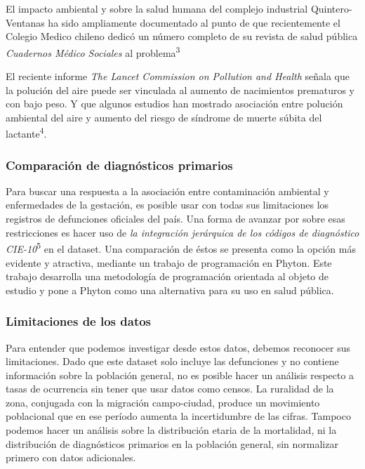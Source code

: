 \documentclass[]{article}
\begin{document}
El impacto ambiental y sobre la salud humana del complejo industrial
Quintero-Ventanas ha sido ampliamente documentado al punto de que recientemente el Colegio Medico chileno dedicó un número completo de su revista de salud
pública \emph{Cuadernos Médico Sociales} al problema\textsuperscript{{3}}

El reciente informe \emph{The Lancet Commission on Pollution and Health}
señala que la polución del aire puede ser vinculada al aumento de
nacimientos prematuros y con bajo peso. Y que algunos estudios han
mostrado asociación entre polución ambiental del aire y aumento del
riesgo de síndrome de muerte súbita del lactante\textsuperscript{{4}}.

\hypertarget{comparaciuxf3n-de-diagnuxf3sticos-primarios}{%
\subsubsection{Comparación de diagnósticos
primarios}\label{comparaciuxf3n-de-diagnuxf3sticos-primarios}}

Para buscar una respuesta a la asociación entre contaminación ambiental y enfermedades de la gestación, es posible usar con todas sus limitaciones los registros de defunciones oficiales del país. Una forma de avanzar por sobre esas restricciones es hacer uso de \emph{la integración jerárquica de los códigos de diagnóstico CIE-10}\textsuperscript{{5}}  en el dataset. Una comparación de éstos se presenta como la
opción más evidente y atractiva, mediante un trabajo de programación en Phyton. Este trabajo desarrolla una metodología de programación orientada al objeto de estudio y pone a Phyton como una alternativa para su uso en salud pública.

\hypertarget{limitaciones de los datos}{%
\subsubsection{Limitaciones de los datos}\label{limitaciones}}

Para entender que podemos investigar desde estos datos, debemos reconocer sus limitaciones. Dado que este dataset solo incluye las defunciones y no contiene
información sobre la población general, no es posible hacer un análisis
respecto a tasas de ocurrencia sin tener que usar datos
como censos. La ruralidad de la zona, conjugada con la migración
campo-ciudad, produce un movimiento poblacional que en ese período aumenta la incertidumbre de las cifras. Tampoco podemos hacer un
análisis sobre la distribución etaria de la mortalidad, ni la
distribución de diagnósticos primarios en la población general, sin
normalizar primero con datos adicionales.
\end{document}
